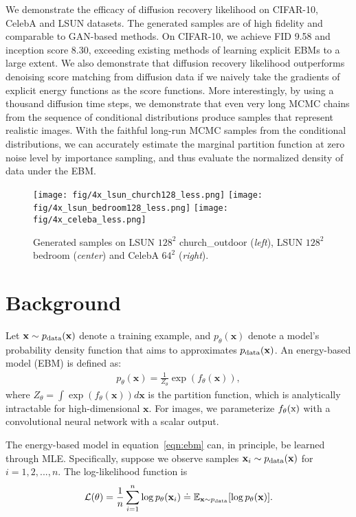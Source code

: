 \documentclass{article} \usepackage{iclr2021_conference,times}
\def\eqref#1{equation~\ref{#1}}
\def\rx{{\textnormal{x}}}
\def\rvx{{\mathbf{x}}}
\newcommand{\pdata}{p_{\rm{data}}}
\newcommand{\E}{\mathbb{E}}
\begin{document}
We demonstrate the efficacy of diffusion recovery likelihood on CIFAR-10, CelebA and LSUN datasets. The generated samples are of high fidelity and comparable to GAN-based methods. On CIFAR-10, we achieve FID 9.58 and inception score 8.30, exceeding existing methods of learning explicit EBMs to a large extent. We also demonstrate that diffusion recovery likelihood outperforms denoising score matching from diffusion data if we naively take the gradients of explicit energy functions as the score functions.  More interestingly, by using a thousand diffusion time steps, we demonstrate that even very long MCMC chains from the sequence of conditional distributions produce samples that represent realistic images. With the faithful long-run MCMC samples from the conditional distributions, we can accurately estimate the marginal partition function at zero noise level by importance sampling, and thus evaluate the normalized density of data under the EBM. 


\begin{figure}[t]
\begin{center}
\texttt{[image: fig/4x\_lsun\_church128\_less.png]} 
\texttt{[image: fig/4x\_lsun\_bedroom128\_less.png]}
\texttt{[image: fig/4x\_celeba\_less.png]} 
\end{center}
\caption{Generated samples on LSUN $128^2$ church\_outdoor ({\em left}), LSUN $128^2$ bedroom ({\em center}) and CelebA $64^2$ ({\em right}).} \label{fig:img1}
\end{figure}

\section{Background}
Let $\rvx \sim \pdata(\rvx)$ denote a training example, and $p_\theta(\rvx)$ denote a model's probability density function that aims to approximates $\pdata(\rvx)$. An energy-based model (EBM) is defined as:
\begin{eqnarray} 
     p_\theta(\rvx) = \frac{1}{Z_\theta}\exp(f_\theta(\rvx)), 
     \label{eqn:ebm}
\end{eqnarray}
where $Z_\theta = \int \exp(f_\theta(\rvx)) d\rvx$ is the partition function, which is analytically intractable for high-dimensional $\rvx$. For images, we parameterize $f_\theta(\rx)$ with a convolutional neural network with a scalar output. 


The energy-based model in \eqref{eqn:ebm} can, in principle, be learned through MLE. Specifically, suppose we observe samples $\rvx_i \sim \pdata(\rvx)$ for $i = 1, 2, ..., n$. The log-likelihood function is 
\begin{eqnarray}
	\mathcal{L}(\theta) = \frac{1}{n} \sum_{i=1}^n \log p_\theta(\rvx_i) \doteq \E_{\rvx \sim \pdata} [\log p_\theta(\rvx)]. \label{eqn:mle}
\end{eqnarray}  
\end{document}
